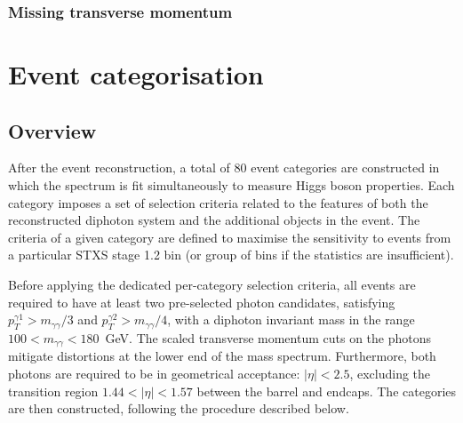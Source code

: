\subsubsection{Missing transverse momentum}





\newpage
\section{Event categorisation}\label{sec:event_categorisation}

\subsection{Overview}
After the event reconstruction, a total of 80 event categories are constructed in which the \mgg spectrum is fit simultaneously to measure Higgs boson properties. Each category imposes a set of selection criteria related to the features of both the reconstructed diphoton system and the additional objects in the event. The criteria of a given category are defined to maximise the sensitivity to events from a particular STXS stage 1.2 bin (or group of bins if the statistics are insufficient).

Before applying the dedicated per-category selection criteria, all events are required to have at least two pre-selected photon candidates, satisfying $p_T^{\gamma 1}>m_{\gamma\gamma}/3$ and $p_T^{\gamma 2}>m_{\gamma\gamma}/4$, with a diphoton invariant mass in the range $100<m_{\gamma\gamma}<180$~GeV. The scaled transverse momentum cuts on the photons mitigate distortions at the lower end of the mass spectrum. Furthermore, both photons are required to be in geometrical acceptance: $|\eta|<2.5$, excluding the transition region $1.44<|\eta|<1.57$ between the barrel and endcaps. The categories are then constructed, following the procedure described below.

